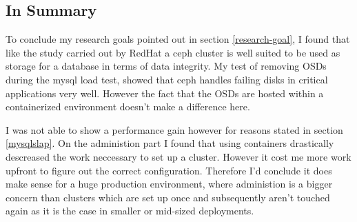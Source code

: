 \documentclass[titlepage, a4paper, 11pt]{scrartcl}
\begin{document}
        \subsection{In Summary}

        To conclude my research goals pointed out in section \ref*{research-goal}, I found that like the study carried out by RedHat\cite{redhatstudy} a ceph cluster is well suited to be used as storage for a database in terms of data integrity. My test of removing OSDs during the mysql load test, showed that ceph handles failing disks in critical applications very well. However the fact that the OSDs are hosted within a containerized environment doesn't make a difference here. 
        
        I was not able to show a performance gain however for reasons stated in section \ref*{mysqlslap}.
        On the administion part I found that using containers drastically descreased the work neccessary to set up a cluster. However it cost me more work upfront to figure out the correct configuration. Therefore I'd conclude it does make sense for a huge production environment, where administion is a bigger concern than clusters which are set up once and subsequently aren't touched again as it is the case in smaller or mid-sized deployments.
      
            
    
\end{document}
